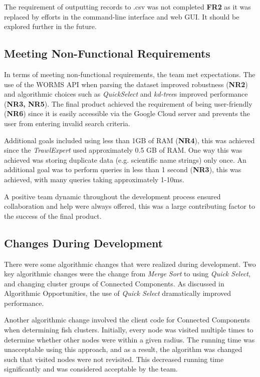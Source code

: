 \documentclass{article}
\begin{document}
The requirement of outputting records to .csv was not completed \textbf{FR2} as it was replaced by efforts in the command-line interface and web GUI. It should be explored further in the future.

\subsection{Meeting Non-Functional Requirements}
In terms of meeting non-functional requirements, the team met expectations. The use of the WORMS API when parsing the dataset improved robustness (\textbf{NR2}) and algorithmic choices such as \textit{QuickSelect} and \textit{kd-tree}s improved performance (\textbf{NR3, NR5}). The final product achieved the requirement of being user-friendly (\textbf{NR6}) since it is easily accessible via the Google Cloud server and prevents the user from entering invalid search criteria. 

Additional goals included using less than 1GB of RAM (\textbf{NR4}), this was achieved since the \textit{TrawlExpert} used approximately 0.5 GB of RAM. One way this was achieved was storing duplicate data (e.g. scientific name strings) only once. An additional goal was to perform queries in less than 1 second (\textbf{NR3}), this was achieved, with many queries taking approximately 1-10ms. 

A positive team dynamic throughout the development process ensured collaboration and help were always offered, this was a large contributing factor to the success of the final product. 

\subsection{Changes During Development}
There were some algorithmic changes that were realized during development. Two key algorithmic changes were the change from \textit{Merge Sort} to using \textit{Quick Select}, and changing cluster groups of Connected Components. As discussed in Algorithmic Opportunities, the use of \textit{Quick Select} dramatically improved performance. 

Another algorithmic change involved the client code for Connected Components when determining fish clusters. Initially, every node was visited multiple times to determine whether other nodes were within a given radius. The running time was unacceptable using this approach, and as a result, the algorithm was changed such that visited nodes were not revisited. This decreased running time significantly and was considered acceptable by the team. 
\end{document}
